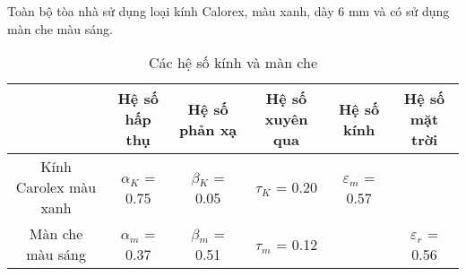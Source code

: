 Toàn bộ tòa nhà sử dụng loại kính Calorex, màu xanh, dày 6 mm và có sử dụng màn che màu sáng.
\begin{table}[H]
	\vspace{-0.3cm}
	\centering
	\caption{Các hệ số kính và màn che}
	\begin{adjustbox}{width=\textwidth}
		\begin{tabular}{|c|c|c|c|c|c|}
			\hline
			& \textbf{Hệ số hấp thụ} & \textbf{Hệ số phản xạ} & \textbf{Hệ số xuyên qua} & \textbf{Hệ số kính} & \textbf{Hệ số mặt trời} \bigstrut\\
			\hline
			\multirow{2}[2]{*}{Kính Carolex màu xanh} & \multirow{2}[2]{*}{{\large $\alpha$}$_{K}$ = 0.75} & \multirow{2}[2]{*}{{\large $\beta$}$_{K}$ = 0.05} & \multirow{2}[2]{*}{{\large $\tau$}$_{K}$ = 0.20} & \multirow{2}[2]{*}{{\large $\varepsilon$}$_{m}$ = 0.57} & \multirow{2}[2]{*}{} \bigstrut[t]\\
			&       &       &       &       &  \bigstrut[b]\\
			\hline
			\multirow{2}[2]{*}{Màn che màu sáng} & \multirow{2}[2]{*}{{\large $\alpha$}$_{m}$ = 0.37} & \multirow{2}[2]{*}{{\large $\beta$}$_{m}$ = 0.51} & \multirow{2}[2]{*}{{\large $\tau$}$_{m}$ = 0.12} & \multirow{2}[2]{*}{} & \multirow{2}[2]{*}{{\large $\varepsilon$}$_{r}$ = 0.56} \bigstrut[t]\\
			&       &       &       &       &  \bigstrut[b]\\
			\hline
		\end{tabular}%
		\label{tab:adadlabel}%
	\end{adjustbox}
\end{table}%

